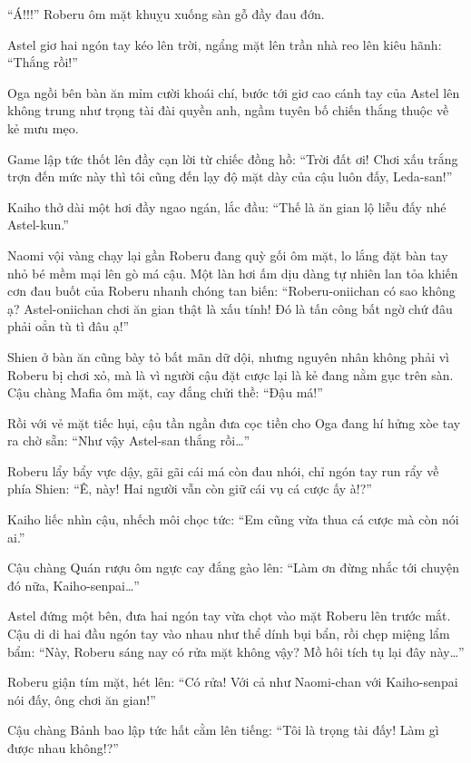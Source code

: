 \documentclass[../main.tex]{subfiles}
\begin{document}
``Á!!!'' Roberu ôm mặt khuỵu xuống sàn gỗ đầy đau đớn.

Astel giơ hai ngón tay kéo lên trời, ngẩng mặt lên trần nhà reo lên kiêu hãnh: ``Thắng rồi!''

Oga ngồi bên bàn ăn mỉm cười khoái chí, bước tới giơ cao cánh tay của Astel lên không trung như trọng tài đài quyền anh, ngầm tuyên bố chiến thắng thuộc về kẻ mưu mẹo.

Game lập tức thốt lên đầy cạn lời từ chiếc đồng hồ: ``Trời đất ơi! Chơi xấu trắng trợn đến mức này thì tôi cũng đến lạy độ mặt dày của cậu luôn đấy, Leda-san!''

Kaiho thở dài một hơi đầy ngao ngán, lắc đầu: ``Thế là ăn gian lộ liễu đấy nhé Astel-kun.''

Naomi vội vàng chạy lại gần Roberu đang quỳ gối ôm mặt, lo lắng đặt bàn tay nhỏ bé mềm mại lên gò má cậu. Một làn hơi ấm dịu dàng tự nhiên lan tỏa khiến cơn đau buốt của Roberu nhanh chóng tan biến: ``Roberu-oniichan có sao không ạ? Astel-oniichan chơi ăn gian thật là xấu tính! Đó là tấn công bất ngờ chứ đâu phải oẳn tù tì đâu ạ!''

Shien ở bàn ăn cũng bày tỏ bất mãn dữ dội, nhưng nguyên nhân không phải vì Roberu bị chơi xỏ, mà là vì người cậu đặt cược lại là kẻ đang nằm gục trên sàn. Cậu chàng Mafia ôm mặt, cay đắng chửi thề: ``Đậu má!''

Rồi với vẻ mặt tiếc hụi, cậu tần ngần đưa cọc tiền cho Oga đang hí hửng xòe tay ra chờ sẵn: ``Như vậy Astel-san thắng rồi\dots''


Roberu lẩy bẩy vực dậy, gãi gãi cái má còn đau nhói, chỉ ngón tay run rẩy về phía Shien: ``Ê, này! Hai người vẫn còn giữ cái vụ cá cược ấy à!?''

Kaiho liếc nhìn cậu, nhếch môi chọc tức: ``Em cũng vừa thua cá cược mà còn nói ai.''

Cậu chàng Quán rượu ôm ngực cay đắng gào lên: ``Làm ơn đừng nhắc tới chuyện đó nữa, Kaiho-senpai\dots''

Astel đứng một bên, đưa hai ngón tay vừa chọt vào mặt Roberu lên trước mắt. Cậu di di hai đầu ngón tay vào nhau như thể dính bụi bẩn, rồi chẹp miệng lẩm bẩm: ``Này, Roberu sáng nay có rửa mặt không vậy? Mồ hôi tích tụ lại đây này\dots''

Roberu giận tím mặt, hét lên: ``Có rửa! Với cả như Naomi-chan với Kaiho-senpai nói đấy, ông chơi ăn gian!''

Cậu chàng Bảnh bao lập tức hất cằm lên tiếng: ``Tôi là trọng tài đấy! Làm gì được nhau không!?''
\end{document}
